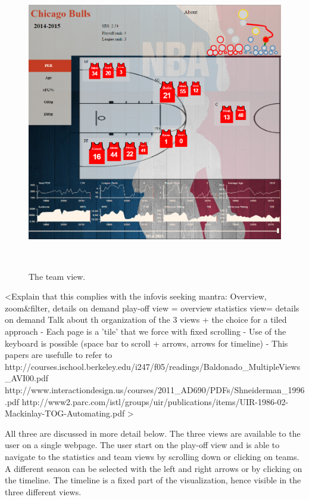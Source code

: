 \documentclass{sigchi}
\begin{document}
\begin{figure}
\centering
  \includegraphics[width=0.9\columnwidth]{figures/teamview}
  \caption{The team view.}~\label{fig:teamview}
\end{figure}

<Explain that this complies with the infovis seeking mantra: Overview, zoom&filter, details on demand
play-off view = overview
statistics view= details on demand
Talk about th organization of the 3 views + the choice for a tiled approach
- Each page is a 'tile' that we force with fixed scrolling
- Use of the keyboard is possible (space bar to scroll + arrows, arrows for timeline)
- This papers are usefulle to refer to
http://courses.ischool.berkeley.edu/i247/f05/readings/Baldonado_MultipleViews_AVI00.pdf
http://www.interactiondesign.us/courses/2011_AD690/PDFs/Shneiderman_1996.pdf
http://www2.parc.com/istl/groups/uir/publications/items/UIR-1986-02-Mackinlay-TOG-Automating.pdf
>

All three are discussed in more detail below. The three views are available to
the user on a single webpage. The user start on the play-off view and is able to
navigate to the statistics and team views by scrolling down or clicking on
teams. A different season can be selected with the left and right arrows or by clicking on the timeline. The timeline is a fixed part of the visualization, hence visible in the three different views.
\end{document}
